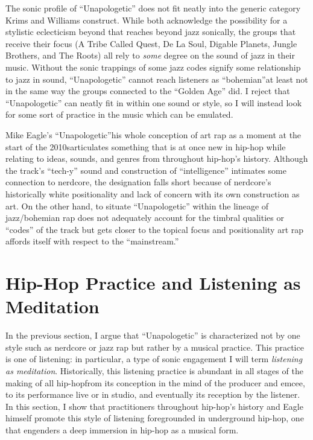 The sonic profile of ``Unapologetic'' does not fit neatly into the generic category Krims and Williams
construct. While both acknowledge the possibility for a stylistic eclecticism beyond that reaches beyond
jazz sonically, the groups that receive their focus (A Tribe Called Quest, De La Soul, Digable Planets, 
Jungle Brothers, and The Roots) all rely to \emph{some} degree on the sound of jazz in their music. 
Without the sonic trappings of some jazz codes signify some relationship to jazz in sound, 
``Unapologetic'' cannot reach listeners as ``bohemian''\textemdash at least not in the same way 
the groups connected to the ``Golden Age'' did. I reject that ``Unapologetic'' can neatly
fit in within one sound or style, so I will instead look for some sort of practice in the music
which can be emulated.

Mike Eagle's ``Unapologetic''\textemdash his whole conception of art rap as a moment at the start
of the 2010s\textemdash articulates something that is at once new in hip-hop while relating to ideas,
sounds, and genres from throughout hip-hop's history. Although the track's ``tech-y'' sound and 
construction of ``intelligence'' intimates some connection to nerdcore, the designation falls short 
because of nerdcore's historically white positionality and lack of concern with its own construction 
as art. On the other hand, to situate ``Unapologetic'' within the lineage of jazz/bohemian rap does 
not adequately account for the  timbral qualities or ``codes'' of the track but gets closer to the 
topical focus and  positionality art rap affords itself with respect to the ``mainstream.''

\section{Hip-Hop Practice and Listening as Meditation} \label{listeningasmeditation}

In the previous section, I argue that ``Unapologetic'' is characterized not by one style such as
nerdcore or jazz rap but rather by a musical practice. This practice is one of listening: in 
particular, a type of sonic engagement I will term \emph{listening as meditation}. Historically,
this listening practice is abundant in all stages of the making of all hip-hop\textemdash from its 
conception in the mind of the producer and emcee, to its performance live or in studio, and 
eventually its reception by the listener. In this section, I show that practitioners throughout
hip-hop's history and Eagle himself promote this style of listening foregrounded in underground
hip-hop, one that engenders a deep immersion in hip-hop as a  musical form.

